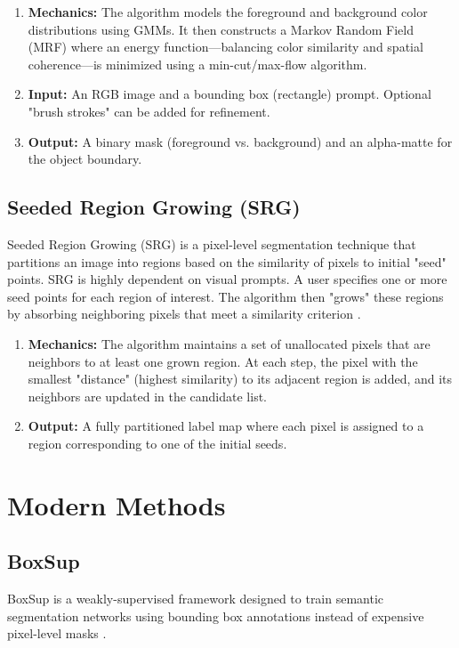 \begin{enumerate}
	\item \textbf{Mechanics:} 
	The algorithm models the foreground and background color distributions using GMMs. It then constructs a Markov Random Field (MRF) where an energy function—balancing color similarity and spatial coherence—is minimized using a min-cut/max-flow algorithm.
	
	\item \textbf{Input:} 
	An RGB image and a bounding box (rectangle) prompt. Optional "brush strokes" can be added for refinement.
	
	\item \textbf{Output:} 
	A binary mask (foreground vs. background) and an alpha-matte for the object boundary.
\end{enumerate}

\subsection{Seeded Region Growing (SRG)}
Seeded Region Growing (SRG) is a pixel-level segmentation technique that partitions an image into regions based on the similarity of pixels to initial "seed" points. SRG is highly dependent on visual prompts. A user specifies one or more seed points for each region of interest. The algorithm then "grows" these regions by absorbing neighboring pixels that meet a similarity criterion \cite{region_growing_2014}.

\begin{enumerate}
	\item \textbf{Mechanics:} 
	The algorithm maintains a set of unallocated pixels that are neighbors to at least one grown region. At each step, the pixel with the smallest "distance" (highest similarity) to its adjacent region is added, and its neighbors are updated in the candidate list.
	
	\item \textbf{Output:} 
	A fully partitioned label map where each pixel is assigned to a region corresponding to one of the initial seeds.
\end{enumerate}


\section{Modern Methods}

\subsection{BoxSup}
BoxSup is a weakly-supervised framework designed to train semantic segmentation networks using bounding box annotations instead of expensive pixel-level masks \cite{box_sup_2015}.

